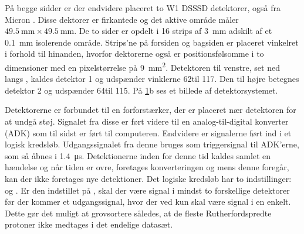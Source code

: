 På begge sidder er der endvidere placeret to W1 DSSSD detektorer, også fra Micron
\cite{micron-W1}. Disse dektorer er firkantede og det aktive område måler
${\SI{49.5}{\mm} \times \SI{49.5}{\mm}}$. De to sider er opdelt i 16 strips af \SI{3}{\mm} 
adskilt af et \SI{0.1}{\mm} isolerende område. Strips'ne på forsiden og bagsiden er placeret
vinkelret i forhold til hinanden, hvorfor dektorerne også er positionsfølsomme i to dimensioner
med en pixelstørrelse på \SI{9}{\mm\squared}. Detektoren til venstre, set ned langs \beamline,
kaldes detektor 1 og udspænder vinklerne 62\degree til 117\degree. Den til højre betegnes detektor 2 og
udspænder 64\degree til 115\degree. På \cref{fig:detektordistro}b ses et billede af
detektorsystemet.
\begin{figure}[b]
  \vspace{-5mm}
  \centering
  \hfill
  \caption{}
  \label{fig:detektordistro}
  \vspace{-1cm}
\end{figure}


Detektorerne er forbundet til en forforstærker, der er placeret nær detektoren for at undgå
støj. Signalet fra disse er ført videre til en analog-til-digital konverter (ADK) som til sidst er
ført til computeren. Endvidere er signalerne ført ind i et logisk kredsløb. Udgangssignalet fra
denne bruges som triggersignal til ADK'erne, som så åbnes i \SI{1.4}{\micro\s}. Detektionerne inden
for denne tid kaldes samlet en hændelse og når tiden er ovre, foretages konverteringen og mens denne
foregår, kan der ikke foretages nye detektioner. Det logiske kredsløb har to indstillinger: \lAND og
\lOR. Er den indstillet på \lAND, skal der være signal i mindst to forskellige detektorer før der
kommer et udgangssignal, hvor der ved \lOR kun skal være signal i en enkelt. Dette gør det muligt at
grovsortere således, at de fleste Rutherfordspredte protoner ikke medtages i det endelige datasæt.
